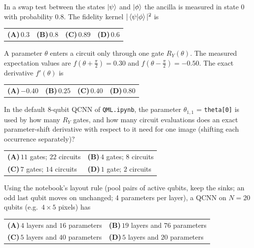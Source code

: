 \documentclass[11pt,a4paper]{article}
\newcommand{\optlabel}[1]{\textbf{(#1)}}
\newenvironment{qitem}[1]{\begin{list}{}{\setlength{\leftmargin}{3.3em}\setlength{\labelwidth}{3.1em}%
  \setlength{\labelsep}{0.2em}\setlength{\topsep}{3pt}\setlength{\parsep}{3pt}}\item[\textbf{Q.#1}\hfill]}{\end{list}}
\newcommand{\qsep}{\par\vspace{2pt}{\color{black!15}\hrule}\vspace{4pt}}
\begin{document}
\begin{qitem}{46}
In a swap test between the states $\ket\psi$ and $\ket\phi$ the ancilla is measured in state $0$ with probability $0.8$.
The fidelity kernel $|\braket{\psi|\phi}|^2$ is
\par\smallskip\noindent\begin{tabularx}{\linewidth}{@{}*{4}{L}@{}}
\optlabel{A}\,$0.3$ & \optlabel{B}\,$0.8$ & \optlabel{C}\,$0.89$ & \optlabel{D}\,$0.6$
\end{tabularx}
\end{qitem}
\qsep

\begin{qitem}{47}
A parameter $\theta$ enters a circuit only through one gate $R_Y(\theta)$. The measured expectation values are
$f(\theta + \frac\pi2) = 0.30$ and $f(\theta - \frac\pi2) = -0.50$. The exact derivative $f'(\theta)$ is
\par\smallskip\noindent\begin{tabularx}{\linewidth}{@{}*{4}{L}@{}}
\optlabel{A}\,$-0.40$ & \optlabel{B}\,$0.25$ & \optlabel{C}\,$0.40$ & \optlabel{D}\,$0.80$
\end{tabularx}
\end{qitem}
\qsep

\begin{qitem}{48}
In the default 8-qubit QCNN of \texttt{QML.ipynb}, the parameter $\theta_{1,1}$ = \texttt{theta[0]} is used by how many
$R_Y$ gates, and how many circuit evaluations does an exact parameter-shift derivative with respect to it need for one image
(shifting each occurrence separately)?
\par\smallskip\noindent\begin{tabularx}{\linewidth}{@{}*{2}{L}@{}}
\optlabel{A}\,$11$ gates; $22$ circuits & \optlabel{B}\,$4$ gates; $8$ circuits \\[3pt]
\optlabel{C}\,$7$ gates; $14$ circuits & \optlabel{D}\,$1$ gate; $2$ circuits
\end{tabularx}
\end{qitem}
\qsep

\begin{qitem}{49}
Using the notebook's layout rule (pool pairs of active qubits, keep the sinks; an odd last qubit moves on unchanged;
4 parameters per layer), a QCNN on $N = 20$ qubits (e.g.\ $4\times5$ pixels) has
\par\smallskip\noindent\begin{tabularx}{\linewidth}{@{}*{2}{L}@{}}
\optlabel{A}\,$4$ layers and $16$ parameters & \optlabel{B}\,$19$ layers and $76$ parameters \\[3pt]
\optlabel{C}\,$5$ layers and $40$ parameters & \optlabel{D}\,$5$ layers and $20$ parameters
\end{tabularx}
\end{qitem}
\qsep
\end{document}
